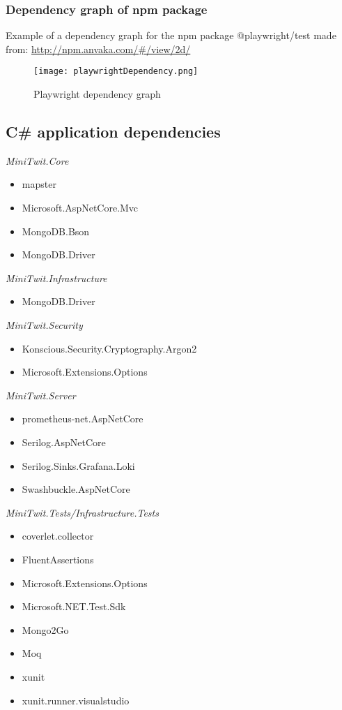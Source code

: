 \subsubsection{Dependency graph of npm package}
Example of a dependency graph for the npm package @playwright/test made from: \url{http://npm.anvaka.com/\#/view/2d/}

\begin{figure}[H]
    \centering
    \texttt{[image: playwrightDependency.png]}
    \caption{Playwright dependency graph}
    \label{fig:playwrightDependencies}
\end{figure}


\subsection{C\# application dependencies}

\textit{MiniTwit.Core}
\begin{itemize}
    \item mapster
    \item Microsoft.AspNetCore.Mvc
    \item MongoDB.Bson
    \item MongoDB.Driver
\end{itemize}


\textit{MiniTwit.Infrastructure}
\begin{itemize}
    \item MongoDB.Driver
\end{itemize}

\textit{MiniTwit.Security}
\begin{itemize}
    \item Konscious.Security.Cryptography.Argon2
    \item Microsoft.Extensions.Options
\end{itemize}

\textit{MiniTwit.Server}
\begin{itemize}
    \item prometheus-net.AspNetCore  
    \item Serilog.AspNetCore    
    \item Serilog.Sinks.Grafana.Loki   
    \item Swashbuckle.AspNetCore 
\end{itemize}


\textit{MiniTwit.Tests/Infrastructure.Tests}
\begin{itemize}
   \item coverlet.collector 
   \item FluentAssertions  
   \item Microsoft.Extensions.Options   
   \item Microsoft.NET.Test.Sdk  
   \item Mongo2Go   
   \item Moq    
   \item xunit     
   \item xunit.runner.visualstudio  
\end{itemize}

